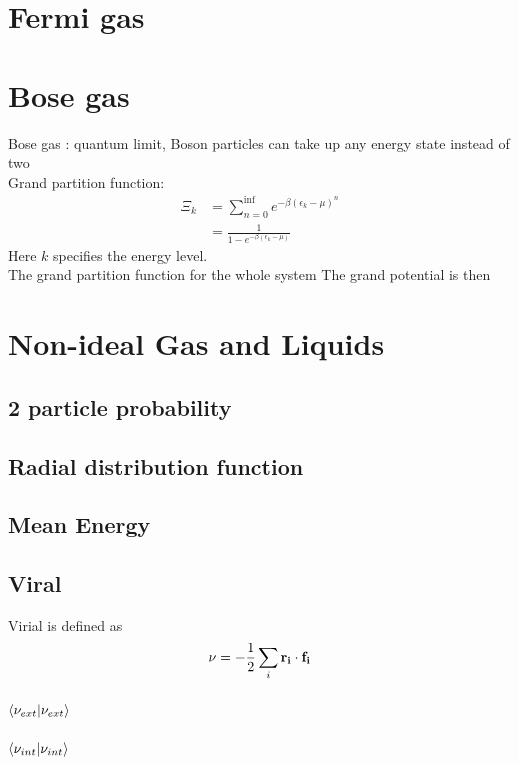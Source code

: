\documentclass[12pt,a4paper]{article}
\begin{document}
\section{Fermi gas}
\section{Bose gas}
    Bose gas : quantum limit, Boson particles can take up any energy state instead of two\\
    Grand partition function:
    \begin{align*}
    \Xi_k   &= \sum_{n=0}^{\inf} e^{-\beta(\epsilon_k-\mu)^n}\\
            &=\frac{1}{1-e^{-\beta(\epsilon_k-\mu)}}
    \end{align*}
    Here $k$ specifies the energy level.\\
    The grand partition function for the whole system
    The grand potential is then
\section{Non-ideal Gas and Liquids}
\subsection{2 particle probability}
\subsection{Radial distribution function}

\subsection{Mean Energy}
\subsection{Viral}
Virial is defined as 
\begin{align*}
    \nu = -\dfrac{1}{2} \sum_i {\vb{r_i}\cdot \vb{f_i}}
\end{align*}
\subsubsection{$\braket{\nu_{ext}}$}
\subsubsection{$\braket{\nu_{int}}$}
\end{document}
